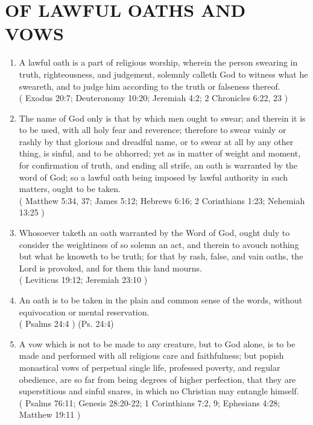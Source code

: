 \documentclass[12pt,a4paper]{book}
\begin{document}
\chapter{OF LAWFUL OATHS AND VOWS}
\label{ch-law-oat-vow}
\begin{enumerate}
\item
\label{ch-law-oat-vow-1}
A lawful oath is a part of religious worship, wherein the person swearing in truth, righteousness, and judgement, solemnly calleth God to witness what he sweareth, and to judge him according to the truth or falseness thereof.\\
( Exodus 20:7; Deuteronomy 10:20; Jeremiah 4:2; 2 Chronicles 6:22, 23 )
\item
\label{ch-law-oat-vow-2}
The name of God only is that by which men ought to swear; and therein it is to be used, with all holy fear and reverence; therefore to swear vainly or rashly by that glorious and dreadful name, or to swear at all by any other thing, is sinful, and to be abhorred; yet as in matter of weight and moment, for confirmation of truth, and ending all strife, an oath is warranted by the word of God; so a lawful oath being imposed by lawful authority in such matters, ought to be taken.\\
( Matthew 5:34, 37; James 5:12; Hebrews 6:16; 2 Corinthians 1:23; Nehemiah 13:25 )
\item
\label{ch-law-oat-vow-3}
Whosoever taketh an oath warranted by the Word of God, ought duly to consider the weightiness of so solemn an act, and therein to avouch nothing but what he knoweth to be truth; for that by rash, false, and vain oaths, the Lord is provoked, and for them this land mourns.\\
( Leviticus 19:12; Jeremiah 23:10 )
\item
\label{ch-law-oat-vow-4}
An oath is to be taken in the plain and common sense of the words, without equivocation or mental reservation.\\
( Psalms 24:4 ) (Ps. 24:4)
\item
\label{ch-law-oat-vow-5}
A vow which is not to be made to any creature, but to God alone, is to be made and performed with all religious care and faithfulness; but popish monastical vows of perpetual single life, professed poverty, and regular obedience, are so far from being degrees of higher perfection, that they are superstitious and sinful snares, in which no Christian may entangle himself.\\
( Psalms 76:11; Genesis 28:20-22; 1 Corinthians 7:2, 9; Ephesians 4:28; Matthew 19:11 )
\end{enumerate}
\end{document}

